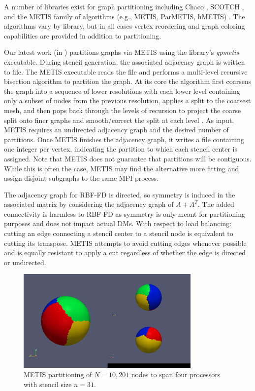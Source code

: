 \documentclass{report}
\begin{document}
A number of libraries exist for graph partitioning including Chaco \cite{CHACO1995}, SCOTCH \cite{SCOTCH1996}, and the METIS family of algorithms (e.g., METIS, ParMETIS, hMETIS) \cite{Karypis1999}. The algorithms vary by library, but in all cases vertex reordering and graph coloring capabilities are provided in addition to partitioning. %

Our latest work (in \cite{BolligRBFFDCode}) partitions graphs via METIS using the library's \emph{gpmetis} executable. During stencil generation, the associated adjacency graph is written to file. The METIS executable reads the file and performs a multi-level recursive bisection algorithm to partition the graph. At its core the algorithm first coarsens the graph into a sequence of lower resolutions with each lower level containing only a subset of nodes from the previous resolution, applies a split to the coarsest mesh, and then pops back through the levels of recursion to project the coarse split onto finer graphs and smooth/correct the split at each level \cite{Karypis1999}. As input, METIS requires an undirected adjacency graph and the desired number of partitions. 
Once METIS finishes the adjacency graph, it writes a file containing one integer per vertex, indicating the partition to which each stencil center is assigned. Note that METIS does not guarantee that partitions will be contiguous. While this is often the case, METIS may find the alternative more fitting and assign disjoint subgraphs to the same MPI process. %

The adjacency graph for RBF-FD is directed, so symmetry is induced in the associated matrix by considering the adjacency graph of $A+A^T$. The added connectivity is harmless to RBF-FD as symmetry is only meant for partitioning purposes and does not impact actual DMs. With respect to load balancing: cutting an edge connecting a stencil center to a stencil node is equivalent to cutting its transpose. METIS attempts to avoid cutting edges whenever possible and is equally resistant to apply a cut regardless of whether the edge is directed or undirected. 

\begin{figure}
\begin{center}
\includegraphics[width=0.8\textwidth]{rbffd_methods_content/decompositions/gpmetis_decomp_sphere_4parts.png}
\caption{METIS partitioning of $N=10,201$ nodes to span four processors with stencil size $n=31$. }
\label{fig:metis_decomposed_sphere}
\end{center}
\end{figure}
\end{document}
